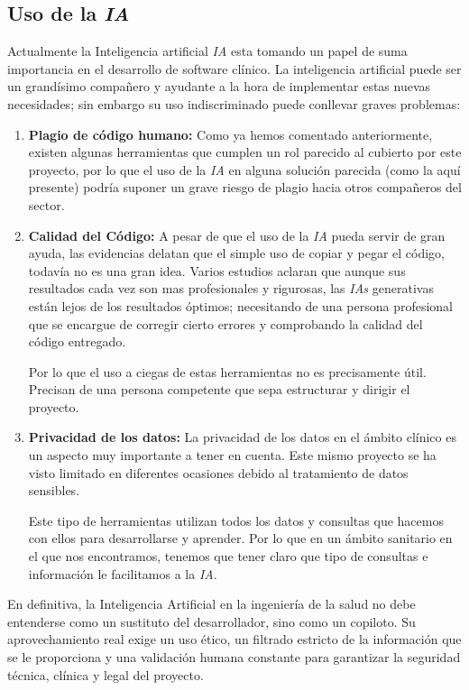 \subsection{Uso de la \textit{IA}}
Actualmente la Inteligencia artificial \textit{IA} esta tomando un papel de suma importancia en el desarrollo de software clínico.
La inteligencia artificial puede ser un grandísimo compañero y ayudante a la hora de implementar estas nuevas necesidades; sin embargo su uso indiscriminado puede conllevar graves problemas:

\begin{enumerate}
    \item \textbf{Plagio de código humano:} Como ya hemos comentado anteriormente, existen algunas herramientas que cumplen un rol parecido al cubierto por este proyecto, por lo que el uso de la \textit{IA} en alguna solución parecida (como la aquí presente) podría suponer un grave riesgo de plagio hacia otros compañeros del sector.

    \item \textbf{Calidad del Código:} A pesar de que el uso de la \textit{IA} pueda servir de gran ayuda, las evidencias delatan que el simple uso de copiar y pegar el código, todavía no es una gran idea. Varios estudios \cite{munoz2024estudio} aclaran que aunque sus resultados cada vez son mas profesionales y rigurosas, las \textit{IAs} generativas están lejos de los resultados óptimos; necesitando de una persona profesional que se encargue de corregir cierto errores y comprobando la calidad del código entregado.

    Por lo que el uso a ciegas de estas herramientas no es precisamente útil. Precisan de una persona competente que sepa estructurar y dirigir el proyecto.
    
    \item \textbf{Privacidad de los datos:} La privacidad de los datos en el ámbito clínico es un aspecto muy importante a tener en cuenta. Este mismo proyecto se ha visto limitado en diferentes ocasiones debido al tratamiento de datos sensibles.
        
    Este tipo de herramientas utilizan todos los datos y consultas que hacemos con ellos para desarrollarse y aprender. Por lo que en un ámbito sanitario en el que nos encontramos, tenemos que tener claro que tipo de consultas e información le facilitamos a la \textit{IA}.
\end{enumerate}

En definitiva, la Inteligencia Artificial en la ingeniería de la salud no debe entenderse como un sustituto del desarrollador, sino como un copiloto. Su aprovechamiento real exige un uso ético, un filtrado estricto de la información que se le proporciona y una validación humana constante para garantizar la seguridad técnica, clínica y legal del proyecto.






